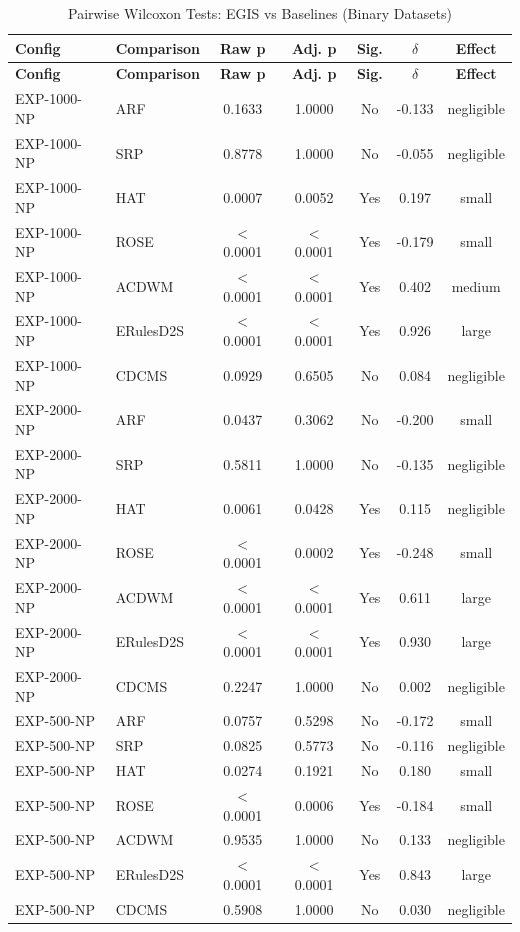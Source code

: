 \documentclass[lettersize,10pt]{article}
\begin{document}
\begin{longtable}{llccccc}
\caption{Pairwise Wilcoxon Tests: EGIS vs Baselines (Binary Datasets)}\label{tab:s_pairwise_all} \\
\toprule
\textbf{Config} & \textbf{Comparison} & \textbf{Raw p} & \textbf{Adj. p} & \textbf{Sig.} & \textbf{$\delta$} & \textbf{Effect} \\
\midrule
\endfirsthead
\toprule
\textbf{Config} & \textbf{Comparison} & \textbf{Raw p} & \textbf{Adj. p} & \textbf{Sig.} & \textbf{$\delta$} & \textbf{Effect} \\
\midrule
\endhead
EXP-1000-NP & ARF & 0.1633 & 1.0000 & No & -0.133 & negligible \\
EXP-1000-NP & SRP & 0.8778 & 1.0000 & No & -0.055 & negligible \\
EXP-1000-NP & HAT & 0.0007 & 0.0052 & Yes & 0.197 & small \\
EXP-1000-NP & ROSE & $<$0.0001 & $<$0.0001 & Yes & -0.179 & small \\
EXP-1000-NP & ACDWM & $<$0.0001 & $<$0.0001 & Yes & 0.402 & medium \\
EXP-1000-NP & ERulesD2S & $<$0.0001 & $<$0.0001 & Yes & 0.926 & large \\
EXP-1000-NP & CDCMS & 0.0929 & 0.6505 & No & 0.084 & negligible \\
\midrule
EXP-2000-NP & ARF & 0.0437 & 0.3062 & No & -0.200 & small \\
EXP-2000-NP & SRP & 0.5811 & 1.0000 & No & -0.135 & negligible \\
EXP-2000-NP & HAT & 0.0061 & 0.0428 & Yes & 0.115 & negligible \\
EXP-2000-NP & ROSE & $<$0.0001 & 0.0002 & Yes & -0.248 & small \\
EXP-2000-NP & ACDWM & $<$0.0001 & $<$0.0001 & Yes & 0.611 & large \\
EXP-2000-NP & ERulesD2S & $<$0.0001 & $<$0.0001 & Yes & 0.930 & large \\
EXP-2000-NP & CDCMS & 0.2247 & 1.0000 & No & 0.002 & negligible \\
\midrule
EXP-500-NP & ARF & 0.0757 & 0.5298 & No & -0.172 & small \\
EXP-500-NP & SRP & 0.0825 & 0.5773 & No & -0.116 & negligible \\
EXP-500-NP & HAT & 0.0274 & 0.1921 & No & 0.180 & small \\
EXP-500-NP & ROSE & $<$0.0001 & 0.0006 & Yes & -0.184 & small \\
EXP-500-NP & ACDWM & 0.9535 & 1.0000 & No & 0.133 & negligible \\
EXP-500-NP & ERulesD2S & $<$0.0001 & $<$0.0001 & Yes & 0.843 & large \\
EXP-500-NP & CDCMS & 0.5908 & 1.0000 & No & 0.030 & negligible \\
\bottomrule
\end{longtable}
\end{document}
